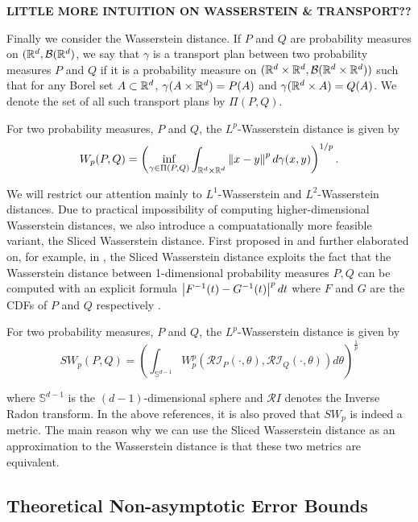 \textbf{LITTLE MORE INTUITION ON WASSERSTEIN \& TRANSPORT??}

Finally we consider the Wasserstein distance.  If $P$ and $Q$ are probability measures on $(\mathbb{R}^d,\mathcal{B}(\mathbb{R}^d)$, we say that $\gamma$ is a transport plan between two probability measures $P$ and $Q$ if it is a probability measure on $(\mathbb{R}^d \times \mathbb{R}^d, \mathcal{B}(\mathbb{R}^d \times \mathbb{R}^d))$ such that for any Borel set $A \subset \mathbb{R}^d$, $\gamma(A \times \mathbb{R}^d)=P(A)$ and $\gamma(\mathbb{R}^d \times A) = Q(A)$.  We denote the set of all such transport plans by $\Pi(P,Q)$.

\begin{defn}
For two probability measures, $P$ and $Q$, the $L^p$-Wasserstein distance is given by
$$
W_p(P,Q) = \left( \inf_{\gamma \in \Pi(P,Q)} \int_{\R^d \times \R^d} \norm{x-y}^p d \gamma(x,y) \right)^{1/p}.
$$
\end{defn}

We will restrict our attention mainly to $L^1$-Wasserstein and $L^2$-Wasserstein distances. Due to practical impossibility of computing higher-dimensional Wasserstein distances, we also introduce a compuatationally more feasible variant, the Sliced Wasserstein distance. First proposed in \cite{rabin2011wasserstein} and further elaborated on, for example, in \cite{gswd}, the Sliced Wasserstein distance exploits the fact that the Wasserstein distance between 1-dimensional probability measures $P, Q$ can be computed with an explicit formula $\abs{F^{-1}(t)-G^{-1}(t)}^p dt$ where $F$ and $G$ are the CDFs of $P$ and $Q$ respectively \cite{ramdas2017wasserstein}.


\begin{defn}
For two probability measures, $P$ and $Q$, the $L^p$-Wasserstein distance is given by
$$
SW_p(P,Q) = \left(\int_{\mathbb S^{d-1} }  W_p^p\left(\mathcal{RI}_P(\cdot, \theta), \mathcal{RI}_Q(\cdot, \theta) \right) d \theta \right)^{\frac 1 p}
$$
\end{defn}

where $\mathbb S^{d-1}$ is the $(d-1)$-dimensional sphere and $\mathcal RI$ denotes the Inverse Radon transform. In the above references, it is also proved that $SW_p$ is indeed a metric. The main reason why we can use the Sliced Wasserstein distance as an approximation to the Wasserstein distance is that these two metrics are equivalent\cite{Santa}.


\subsection{Theoretical Non-asymptotic Error Bounds}


